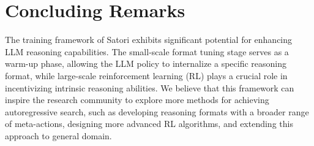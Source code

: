 \section{Concluding Remarks}
The training framework of Satori exhibits significant potential for enhancing LLM reasoning capabilities. The small-scale format tuning stage serves as a warm-up phase, allowing the LLM policy to internalize a specific reasoning format, while large-scale reinforcement learning (RL) plays a crucial role in incentivizing intrinsic reasoning abilities. We believe that this framework can inspire the research community to explore more methods for achieving autoregressive search, such as developing reasoning formats with a broader range of meta-actions, designing more advanced RL algorithms, and extending this approach to general domain.